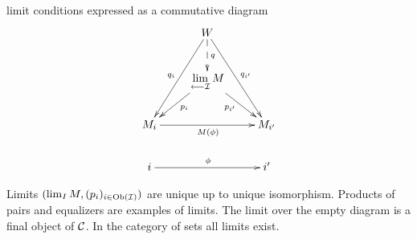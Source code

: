 \begin{frame}
\begin{block}{limit conditions expressed as a commutative diagram}
\begin{displaymath}
\xymatrix{
&\ar[ldd]_{q_i} W \ar@{-->}[d]^{q} \ar[rdd]^{q_{i'}} & \\
& \ar[ld]^{p_i} \lim\limits_{\longleftarrow \mathcal{I}} M \ar[rd]_{p_{i'}} &\\
M_i  \ar[rr]_{M(\phi)} & & M_{i'} \\
i \ar[rr]^{\phi} & & i'  
}
\end{displaymath}
\end{block}
\begin{block}{}
Limits $(\mathop{\rm lim}\nolimits_I M, (p_i)_{i\in \mathop{\rm Ob}\nolimits(\mathcal{I})})$ are unique up to unique isomorphism. Products of pairs and equalizers are examples of limits. The limit over the empty diagram is a final object of ${\mathcal C}$. In the category of sets all limits exist.
\end{block}
\end{frame}